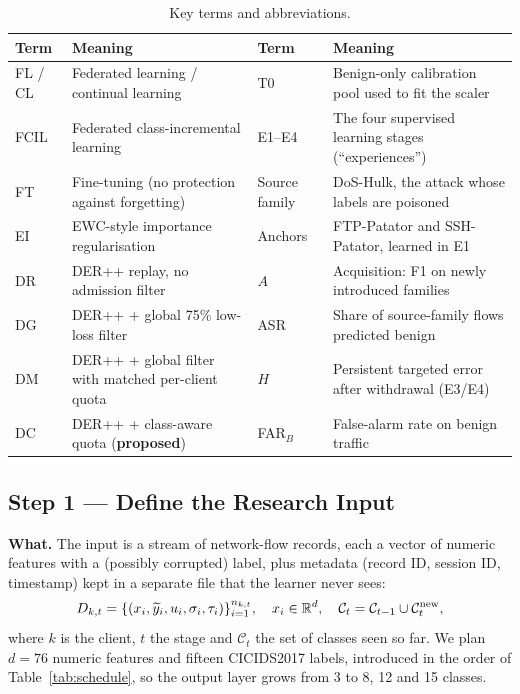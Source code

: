 \documentclass[10pt,a4paper]{article}
\begin{document}
\begin{table}[htbp]
\centering\footnotesize
\caption{Key terms and abbreviations.}
\label{tab:terms}
\begin{tabularx}{\linewidth}{L{2.2cm}Y L{2.2cm}Y}
\toprule
Term & Meaning & Term & Meaning\\
\midrule
FL / CL & Federated learning / continual learning & T0 & Benign-only calibration pool used to fit the scaler\\
FCIL & Federated class-incremental learning & E1--E4 & The four supervised learning stages (\enquote{experiences})\\
FT & Fine-tuning (no protection against forgetting) & Source family & DoS-Hulk, the attack whose labels are poisoned\\
EI & EWC-style importance regularisation & Anchors & FTP-Patator and SSH-Patator, learned in E1\\
DR & DER++ replay, no admission filter & $A$ & Acquisition: F1 on newly introduced families\\
DG & DER++ + global 75\% low-loss filter & ASR & Share of source-family flows predicted benign\\
DM & DER++ + global filter with matched per-client quota & $H$ & Persistent targeted error after withdrawal (E3/E4)\\
DC & DER++ + class-aware quota (\textbf{proposed}) & FAR$_B$ & False-alarm rate on benign traffic\\
\bottomrule
\end{tabularx}
\end{table}

\subsection{Step 1 --- Define the Research Input}
\textbf{What.} The input is a stream of network-flow records, each a vector of numeric features with a (possibly corrupted) label, plus metadata (record ID, session ID, timestamp) kept in a separate file that the learner never sees:
\begin{equation}
D_{k,t}=\{(x_i,\widetilde y_i,u_i,\sigma_i,\tau_i)\}_{i=1}^{n_{k,t}},\quad
x_i\in\mathbb R^d,\quad\mathcal C_t=\mathcal C_{t-1}\cup\mathcal C_t^{\rm new},
\label{eq:input}
\end{equation}
where $k$ is the client, $t$ the stage and $\mathcal C_t$ the set of classes seen so far. We plan $d=76$ numeric features and fifteen CICIDS2017 labels, introduced in the order of Table~\ref{tab:schedule}, so the output layer grows from 3 to 8, 12 and 15 classes.
\end{document}
